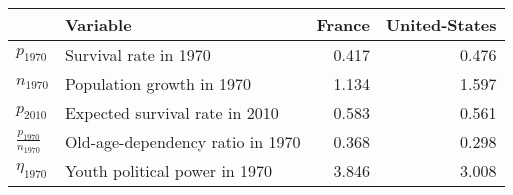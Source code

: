 
\begin{tabular}{llrr}
\toprule
\textbf{} & \textbf{Variable} & \textbf{France} & \textbf{United-States}\\
\midrule
$p_{1970}$ & Survival rate in 1970 & 0.417 & 0.476\\
$n_{1970}$ & Population growth in 1970 & 1.134 & 1.597\\
$p_{2010}$ & Expected survival rate in 2010 & 0.583 & 0.561\\
$\frac{p_{1970}}{n_{1970}}$ & Old-age-dependency ratio in 1970 & 0.368 & 0.298\\
$\eta_{1970}$ & Youth political power in 1970 & 3.846 & 3.008\\
\bottomrule
\end{tabular}

